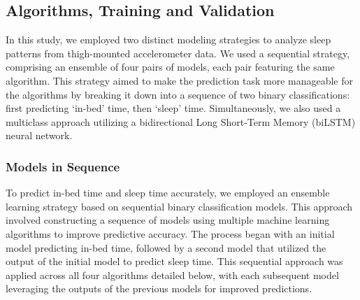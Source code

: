 \documentclass[
  super,
  preprint,
  3p]{elsarticle}
\begin{document}
\hypertarget{algorithms-training-and-validation}{%
\subsection{Algorithms, Training and
Validation}\label{algorithms-training-and-validation}}

In this study, we employed two distinct modeling strategies to analyze
sleep patterns from thigh-mounted accelerometer data. We used a
sequential strategy, comprising an ensemble of four pairs of models,
each pair featuring the same algorithm. This strategy aimed to make the
prediction task more manageable for the algorithms by breaking it down
into a sequence of two binary classifications: first predicting `in-bed'
time, then `sleep' time. Simultaneously, we also used a multiclass
approach utilizing a bidirectional Long Short-Term Memory
(biLSTM)\citep{hochreiter1997} neural network.

\hypertarget{models-in-sequence}{%
\subsubsection{Models in Sequence}\label{models-in-sequence}}

To predict in-bed time and sleep time accurately, we employed an
ensemble learning strategy based on sequential binary classification
models. This approach involved constructing a sequence of models using
multiple machine learning algorithms to improve predictive accuracy. The
process began with an initial model predicting in-bed time, followed by
a second model that utilized the output of the initial model to predict
sleep time. This sequential approach was applied across all four
algorithms detailed below, with each subsequent model leveraging the
outputs of the previous models for improved predictions.
\end{document}
